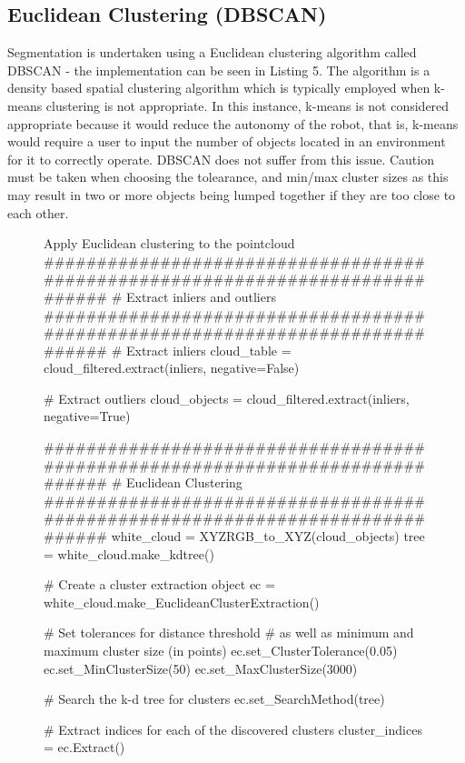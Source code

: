 \documentclass[a4paper]{article}
\begin{document}
\newpage

\subsection{Euclidean Clustering (DBSCAN)}
Segmentation is undertaken using a Euclidean clustering algorithm called DBSCAN - the implementation can be seen in Listing 5. The algorithm is a density based spatial clustering algorithm which is typically employed when k-means clustering is not appropriate. In this instance, k-means is not considered appropriate because it would reduce the autonomy of the robot, that is, k-means would require a user to input the number of objects located in an environment for it to correctly operate. DBSCAN does not suffer from this issue. Caution must be taken when choosing the tolearance, and min/max cluster sizes as this may result in two or more objects being lumped together if they are too close to each other.

\vspace{0.5cm}

\begin{figure}[h]\scriptsize
\begin{sexylisting}{Apply Euclidean clustering to the pointcloud}
##############################################################################
    # Extract inliers and outliers
##############################################################################
    # Extract inliers
    cloud_table = cloud_filtered.extract(inliers, negative=False)

    # Extract outliers
    cloud_objects = cloud_filtered.extract(inliers, negative=True)


##############################################################################
    # Euclidean Clustering
##############################################################################
    white_cloud = XYZRGB_to_XYZ(cloud_objects)
    tree = white_cloud.make_kdtree()

    # Create a cluster extraction object
    ec = white_cloud.make_EuclideanClusterExtraction()

    # Set tolerances for distance threshold
    # as well as minimum and maximum cluster size (in points)
    ec.set_ClusterTolerance(0.05)
    ec.set_MinClusterSize(50)
    ec.set_MaxClusterSize(3000)

    # Search the k-d tree for clusters
    ec.set_SearchMethod(tree)

    # Extract indices for each of the discovered clusters
    cluster_indices = ec.Extract()
\end{sexylisting}
\end{figure}
\end{document}
